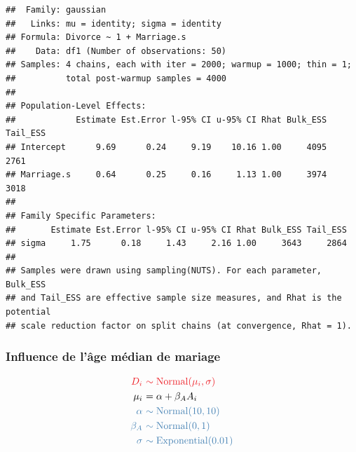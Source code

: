 \documentclass[
  a4paper,11pt,twoside,onecolumn,openright,final,oldfontcommands]{memoir}
\theoremstyle{definition}
\theoremstyle{definition}
\theoremstyle{definition}
\theoremstyle{remark}
\begin{document}
\begin{verbatim}
##  Family: gaussian 
##   Links: mu = identity; sigma = identity 
## Formula: Divorce ~ 1 + Marriage.s 
##    Data: df1 (Number of observations: 50) 
## Samples: 4 chains, each with iter = 2000; warmup = 1000; thin = 1;
##          total post-warmup samples = 4000
## 
## Population-Level Effects: 
##            Estimate Est.Error l-95% CI u-95% CI Rhat Bulk_ESS Tail_ESS
## Intercept      9.69      0.24     9.19    10.16 1.00     4095     2761
## Marriage.s     0.64      0.25     0.16     1.13 1.00     3974     3018
## 
## Family Specific Parameters: 
##       Estimate Est.Error l-95% CI u-95% CI Rhat Bulk_ESS Tail_ESS
## sigma     1.75      0.18     1.43     2.16 1.00     3643     2864
## 
## Samples were drawn using sampling(NUTS). For each parameter, Bulk_ESS
## and Tail_ESS are effective sample size measures, and Rhat is the potential
## scale reduction factor on split chains (at convergence, Rhat = 1).
\end{verbatim}

\hypertarget{influence-de-luxe2ge-muxe9dian-de-mariage}{%
\subsubsection{Influence de l'âge médian de mariage}\label{influence-de-luxe2ge-muxe9dian-de-mariage}}

\[
\begin{aligned}
\color{orangered}{D_{i}} \ &\color{orangered}{\sim \mathrm{Normal}(\mu_{i}, \sigma)} \\
\color{black}{\mu_{i}} \ &\color{black}{= \alpha + \beta_{A} A_{i}} \\
\color{steelblue}{\alpha} \ &\color{steelblue}{\sim \mathrm{Normal}(10, 10)} \\
\color{steelblue}{\beta_{A}} \ &\color{steelblue}{\sim \mathrm{Normal}(0, 1)} \\
\color{steelblue}{\sigma} \ &\color{steelblue}{\sim \mathrm{Exponential}(0.01)} \\
\end{aligned}
\]
\end{document}
